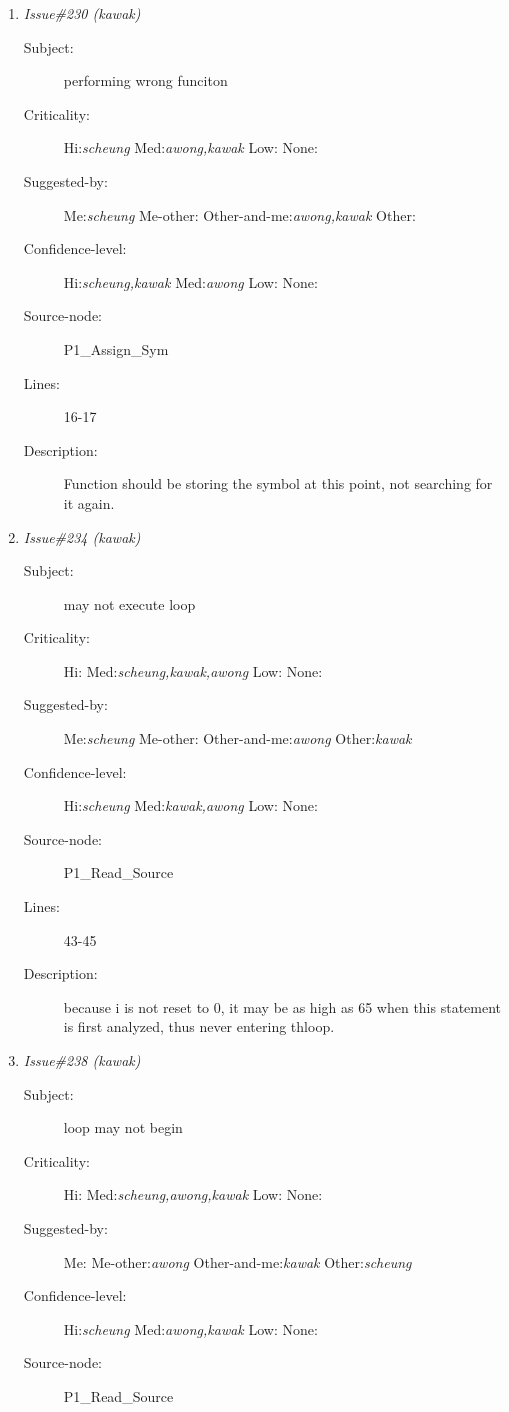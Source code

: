 \begin{enumerate}
\begin{description}
\item [Lines:] 54-56

\item [Description:] if the table is full, there is no provision to break out of the loop, so this
may run forever.
\end{description}
\item {\it Issue\#230 (kawak)}
\begin{description}
\item [Subject:] performing wrong funciton
\item [Criticality:] Hi:{\it scheung} Med:{\it awong,kawak} Low:{\it } None:{\it }
\item [Suggested-by:] Me:{\it scheung} Me-other:{\it } Other-and-me:{\it awong,kawak} Other:{\it }
\item [Confidence-level:] Hi:{\it scheung,kawak} Med:{\it awong} Low:{\it } None:{\it }
\item [Source-node:] P1\_Assign\_Sym

\item [Lines:] 16-17

\item [Description:] Function should be storing the symbol at this point, not searching for it
again.
\end{description}
\item {\it Issue\#234 (kawak)}
\begin{description}
\item [Subject:] may not execute loop
\item [Criticality:] Hi:{\it } Med:{\it scheung,kawak,awong} Low:{\it } None:{\it }
\item [Suggested-by:] Me:{\it scheung} Me-other:{\it } Other-and-me:{\it awong} Other:{\it kawak}
\item [Confidence-level:] Hi:{\it scheung} Med:{\it kawak,awong} Low:{\it } None:{\it }
\item [Source-node:] P1\_Read\_Source

\item [Lines:] 43-45

\item [Description:] because i is not reset to 0, it may be as high as 65 when this statement is
first analyzed, thus never entering thloop.
\end{description}
\item {\it Issue\#238 (kawak)}
\begin{description}
\item [Subject:] loop may not begin
\item [Criticality:] Hi:{\it } Med:{\it scheung,awong,kawak} Low:{\it } None:{\it }
\item [Suggested-by:] Me:{\it } Me-other:{\it awong} Other-and-me:{\it kawak} Other:{\it scheung}
\item [Confidence-level:] Hi:{\it scheung} Med:{\it awong,kawak} Low:{\it } None:{\it }
\item [Source-node:] P1\_Read\_Source


\end{description}
\end{enumerate}
